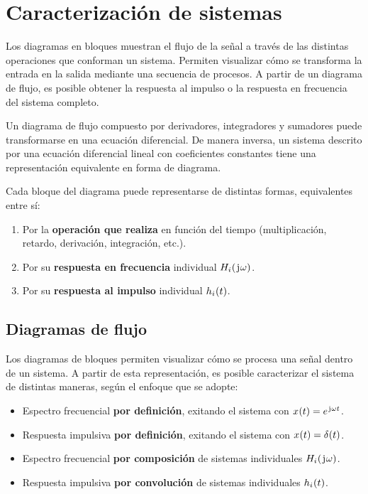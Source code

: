 \chapter{Caracterización de sistemas}

Los diagramas en bloques muestran el flujo de la señal a través de las distintas operaciones que conforman un sistema.
Permiten visualizar cómo se transforma la entrada en la salida mediante una secuencia de procesos.
A partir de un diagrama de flujo, es posible obtener la respuesta al impulso o la respuesta en frecuencia del sistema completo.

Un diagrama de flujo compuesto por derivadores, integradores y sumadores puede transformarse en una ecuación diferencial.
De manera inversa, un sistema descrito por una ecuación diferencial lineal con coeficientes constantes tiene una representación equivalente en forma de diagrama.

Cada bloque del diagrama puede representarse de distintas formas, equivalentes entre sí:

\begin{enumerate}
    \item Por la \textbf{operación que realiza} en función del tiempo (multiplicación, retardo, derivación, integración, etc.).
    \item Por su \textbf{respuesta en frecuencia} individual $\fx[H_\ith]{\iu \omega}$.
    \item Por su \textbf{respuesta al impulso} individual $\fx[h_\ith]{t}$.
\end{enumerate}

\section{Diagramas de flujo}

Los diagramas de bloques permiten visualizar cómo se procesa una señal dentro de un sistema.
A partir de esta representación, es posible caracterizar el sistema de distintas maneras, según el enfoque que se adopte:

\begin{itemize}
    \item Espectro frecuencial \textbf{por definición}, exitando el sistema con $\fx[x]{t} = \complexExp$.
    \item Respuesta impulsiva \textbf{por definición}, exitando el sistema con $\fx[x]{t} = \fx[\delta]{t}$.
    \item Espectro frecuencial \textbf{por composición} de sistemas individuales $\fx[H_\ith]{\iu \omega}$.
    \item Respuesta impulsiva \textbf{por convolución} de sistemas individuales $\fx[h_\ith]{t}$.
\end{itemize}

